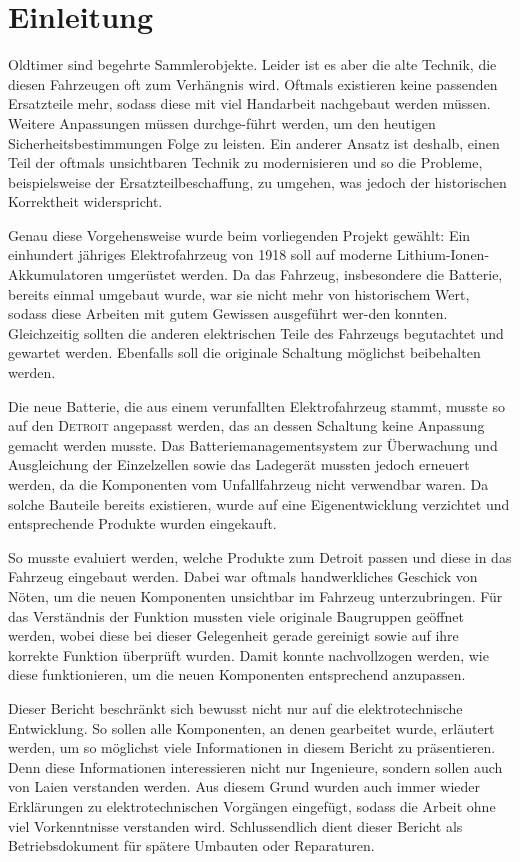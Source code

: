 \chapter{Einleitung}

\color{blue}
Oldtimer sind begehrte Sammlerobjekte. Leider ist es aber die alte Technik, die diesen Fahrzeugen oft zum Verhängnis wird. Oftmals existieren keine passenden Ersatzteile mehr, sodass diese mit viel Handarbeit nachgebaut werden müssen. Weitere Anpassungen müssen durchge-führt werden, um den heutigen Sicherheitsbestimmungen Folge zu leisten. Ein anderer Ansatz ist deshalb, einen Teil der oftmals unsichtbaren Technik zu modernisieren und so die Probleme, beispielsweise der Ersatzteilbeschaffung, zu umgehen, was jedoch der historischen Korrektheit widerspricht.

Genau diese Vorgehensweise wurde beim vorliegenden Projekt gewählt: Ein einhundert jähriges Elektrofahrzeug von 1918 soll auf moderne Lithium-Ionen-Akkumulatoren umgerüstet werden. Da das Fahrzeug, insbesondere die Batterie, bereits einmal umgebaut wurde, war sie nicht mehr von historischem Wert, sodass diese Arbeiten mit gutem Gewissen ausgeführt wer-den konnten. Gleichzeitig sollten die anderen elektrischen Teile des Fahrzeugs begutachtet und gewartet werden. Ebenfalls soll die originale Schaltung möglichst beibehalten werden.

Die neue Batterie, die aus einem verunfallten Elektrofahrzeug stammt, musste so auf den \textsc{Detroit} angepasst werden, das an dessen Schaltung keine Anpassung gemacht werden musste. Das Batteriemanagementsystem zur Überwachung und Ausgleichung der Einzelzellen sowie das Ladegerät mussten jedoch erneuert werden, da die Komponenten vom Unfallfahrzeug nicht verwendbar waren. Da solche Bauteile bereits existieren, wurde auf eine Eigenentwicklung verzichtet und entsprechende Produkte wurden eingekauft.

So musste evaluiert werden, welche Produkte zum Detroit passen und diese in das Fahrzeug eingebaut werden. Dabei war oftmals handwerkliches Geschick von Nöten, um die neuen Komponenten unsichtbar im Fahrzeug unterzubringen. Für das Verständnis der Funktion mussten
viele originale Baugruppen geöffnet werden, wobei diese bei dieser Gelegenheit gerade gereinigt sowie auf ihre korrekte Funktion überprüft wurden. Damit konnte nachvollzogen werden, wie diese funktionieren, um die neuen Komponenten entsprechend anzupassen.

Dieser Bericht beschränkt sich bewusst nicht nur auf die elektrotechnische Entwicklung. So sollen alle Komponenten, an denen gearbeitet wurde, erläutert werden, um so möglichst viele Informationen in diesem Bericht zu präsentieren. Denn diese Informationen interessieren nicht nur Ingenieure, sondern sollen auch von Laien verstanden werden. Aus diesem Grund wurden auch immer wieder Erklärungen zu elektrotechnischen Vorgängen eingefügt, sodass die Arbeit ohne viel Vorkenntnisse verstanden wird. Schlussendlich dient dieser Bericht als Betriebsdokument für spätere Umbauten oder Reparaturen.
 \color{black}
